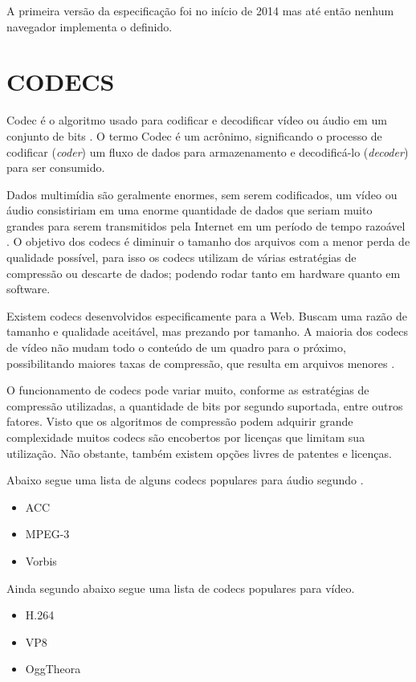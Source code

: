 A primeira versão da especificação foi no início de 2014 mas até
então nenhum navegador implementa o definido.
\section{CODECS}

Codec é o algoritmo usado para codificar e decodificar vídeo ou
áudio em um conjunto de bits \autocite{diveIntohtml}. O termo Codec é
um acrônimo, significando o processo de codificar (\textit{coder}) um fluxo de dados
para armazenamento e decodificá-lo (\textit{decoder}) para ser consumido.

Dados multimídia são geralmente enormes, sem serem codificados,
um vídeo ou áudio consistiriam em uma enorme quantidade de dados
que seriam muito grandes para serem transmitidos pela Internet em um
período de tempo razoável \autocite[pp. 66]{proHtml5}. O objetivo dos
codecs é diminuir o tamanho dos arquivos com a menor perda de qualidade
possível, para isso os codecs utilizam de várias estratégias de
compressão ou descarte de dados; podendo rodar tanto em hardware quanto
em software.

Existem codecs desenvolvidos especificamente para a Web. Buscam uma
razão de tamanho e qualidade aceitável, mas prezando por tamanho. A
maioria dos codecs de vídeo não mudam todo o conteúdo de um quadro
para o próximo, possibilitando maiores taxas de compressão, que
resulta em arquivos menores \autocite{diveIntohtml}.

O funcionamento de codecs pode variar muito, conforme as estratégias de
compressão utilizadas, a quantidade de bits por segundo suportada, entre outros
fatores. Visto que os algoritmos de compressão podem adquirir grande
complexidade muitos codecs são encobertos por licenças
que limitam sua utilização. Não obstante, também existem opções
livres de patentes e licenças.

Abaixo segue uma lista de alguns codecs populares para áudio segundo \cite[pp. 67]{proHtml5}.

\begin{itemize}
    \item ACC
    \item MPEG-3
    \item Vorbis
\end{itemize}

Ainda segundo \cite[pp. 67]{proHtml5} abaixo segue uma lista de codecs populares para vídeo.
\begin{itemize}
    \item H.264
    \item VP8
    \item OggTheora
\end{itemize}

